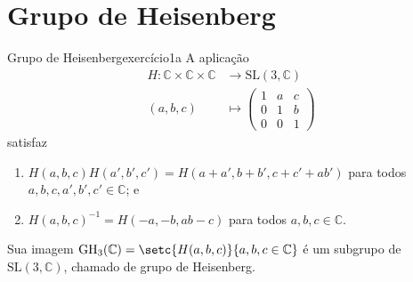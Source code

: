 \section{Grupo de Heisenberg}
\begin{proposition}{Grupo de Heisenberg}{exercício1a}
    A aplicação
    \begin{align*}
        H : \mathbb{C} \times \mathbb{C} \times \mathbb{C} &\to \mathrm{SL}(3,\mathbb{C})\\
                                                   (a,b,c) &\mapsto \begin{pmatrix}
                                                               1 & a & c\\
                                                               0 & 1 & b\\
                                                               0 & 0 & 1
                                                           \end{pmatrix}
    \end{align*}
    satisfaz
    \begin{enumerate}[label=(\alph*)]
        \item \(H(a,b,c)H(a', b', c') = H(a+ a', b+ b', c+c' +ab')\) para todos \(a,b,c, a',b', c' \in \mathbb{C}\); e
        \item \(H(a,b,c)^{-1} = H(-a,-b,ab-c)\) para todos \(a,b,c \in \mathbb{C}\).
    \end{enumerate}
    Sua imagem \(\mathrm{GH}_3(\mathbb{C}) = \setc{H(a,b,c)}{a,b,c \in \mathbb{C}}\) é um subgrupo de \(\mathrm{SL}(3, \mathbb{C})\), chamado de grupo de Heisenberg.
\end{proposition}

